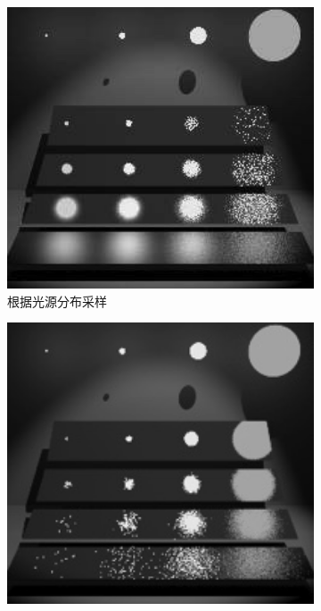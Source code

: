 \begin{figure}
	\begin{subfigure}[b]{0.328\textwidth}
		\includegraphics[width=1.0\textwidth]{figures/mc/mis-1}
		\caption{根据光源分布采样}
	\end{subfigure}
	\begin{subfigure}[b]{0.328\textwidth}
		\includegraphics[width=1.0\textwidth]{figures/mc/mis-2}

\end{subfigure}
\end{figure}
